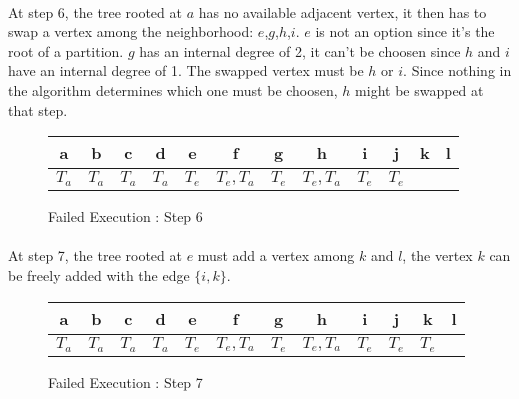 \paragraph{}
At step 6, the tree rooted at $a$ has no available adjacent vertex, it then
has to swap a vertex among the neighborhood: $e$,$g$,$h$,$i$. $e$ is not an
option since it's the root of a partition. $g$ has an internal degree of 2, it
can't be choosen since $h$ and $i$ have an internal degree of 1. The swapped
vertex must be $h$ or $i$. Since nothing in the algorithm determines which one
must be choosen, $h$ might be swapped at that step.

\begin{figure}[H]
  \caption{Failed Execution : Step 6}
  \begin{center}
    \begin{tikzpicture}[scale=0.9,transform shape]
      
    \end{tikzpicture}
    \begin{tabular}{|c|c|c|c|c|c|c|c|c|c|c|c|}
\hline
a & b & c & d & e & f & g & h & i & j & k & l\\
\hline
$T_a$ & $T_a$ & $T_a$ & $T_a$ & $T_e$ & $T_e, T_a$ & $T_e$ & $T_e, T_a$ & $T_e$ & $T_e$ & &\\
\hline
    \end{tabular}
  \end{center}
\end{figure}

\paragraph{}
At step 7, the tree rooted at $e$ must add a vertex among $k$ and $l$, the
vertex $k$ can be freely added with the edge $\{i,k\}$.

\begin{figure}[H]
  \caption{Failed Execution : Step 7}
  \begin{center}
    \begin{tikzpicture}[scale=0.9,transform shape]
      
    \end{tikzpicture}
    \begin{tabular}{|c|c|c|c|c|c|c|c|c|c|c|c|}
\hline
a & b & c & d & e & f & g & h & i & j & k & l\\
\hline
$T_a$ & $T_a$ & $T_a$ & $T_a$ & $T_e$ & $T_e, T_a$ & $T_e$ & $T_e, T_a$ & $T_e$ & $T_e$ & $T_e$ &\\
\hline
    \end{tabular}
  \end{center}
\end{figure}

